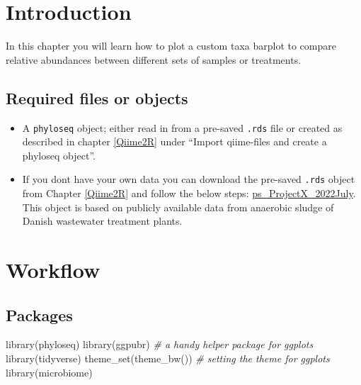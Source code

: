 \documentclass[
]{book}
\newenvironment{Shaded}{\begin{snugshade}}{\end{snugshade}}
\newcommand{\CommentTok}[1]{\textcolor[rgb]{0.56,0.35,0.01}{\textit{#1}}}
\newcommand{\FunctionTok}[1]{\textcolor[rgb]{0.00,0.00,0.00}{#1}}
\newcommand{\NormalTok}[1]{#1}
\providecommand{\tightlist}{%
  \setlength{\itemsep}{0pt}\setlength{\parskip}{0pt}}
\begin{document}
\hypertarget{introduction-4}{%
\section{Introduction}\label{introduction-4}}

In this chapter you will learn how to plot a custom taxa barplot to compare relative abundances between different sets of samples or treatments.

\hypertarget{required-files-or-objects}{%
\subsection{Required files or objects}\label{required-files-or-objects}}

\begin{itemize}
\tightlist
\item
  A \texttt{phyloseq} object; either read in from a pre-saved \texttt{.rds} file or created as described in chapter \ref{Qiime2R} under ``Import qiime-files and create a phyloseq object''.\\
\item
  If you dont have your own data you can download the pre-saved \texttt{.rds} object from Chapter \ref{Qiime2R} and follow the below steps: \href{./ps_ProjectX_2022July}{ps\_ProjectX\_2022July}. This object is based on publicly available data from anaerobic sludge of Danish wastewater treatment plants.
\end{itemize}

\hypertarget{workflow-4}{%
\section{Workflow}\label{workflow-4}}

\hypertarget{packages-2}{%
\subsection{Packages}\label{packages-2}}

\begin{Shaded}
\begin{Highlighting}[]
\FunctionTok{library}\NormalTok{(phyloseq)}
\FunctionTok{library}\NormalTok{(ggpubr)       }\CommentTok{\# a handy helper package for ggplots}
\FunctionTok{library}\NormalTok{(tidyverse)}
\FunctionTok{theme\_set}\NormalTok{(}\FunctionTok{theme\_bw}\NormalTok{())  }\CommentTok{\# setting the theme for ggplots}
\FunctionTok{library}\NormalTok{(microbiome)}
\end{Highlighting}
\end{Shaded}
\end{document}
